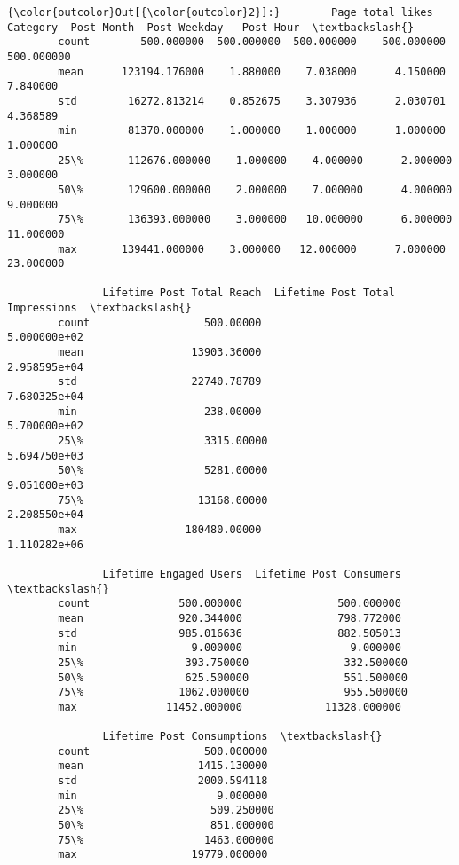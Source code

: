 \documentclass[11pt]{article}
\begin{document}
\begin{Verbatim}[commandchars=\\\{\}]
{\color{outcolor}Out[{\color{outcolor}2}]:}        Page total likes    Category  Post Month  Post Weekday   Post Hour  \textbackslash{}
        count        500.000000  500.000000  500.000000    500.000000  500.000000   
        mean      123194.176000    1.880000    7.038000      4.150000    7.840000   
        std        16272.813214    0.852675    3.307936      2.030701    4.368589   
        min        81370.000000    1.000000    1.000000      1.000000    1.000000   
        25\%       112676.000000    1.000000    4.000000      2.000000    3.000000   
        50\%       129600.000000    2.000000    7.000000      4.000000    9.000000   
        75\%       136393.000000    3.000000   10.000000      6.000000   11.000000   
        max       139441.000000    3.000000   12.000000      7.000000   23.000000   
        
               Lifetime Post Total Reach  Lifetime Post Total Impressions  \textbackslash{}
        count                  500.00000                     5.000000e+02   
        mean                 13903.36000                     2.958595e+04   
        std                  22740.78789                     7.680325e+04   
        min                    238.00000                     5.700000e+02   
        25\%                   3315.00000                     5.694750e+03   
        50\%                   5281.00000                     9.051000e+03   
        75\%                  13168.00000                     2.208550e+04   
        max                 180480.00000                     1.110282e+06   
        
               Lifetime Engaged Users  Lifetime Post Consumers  \textbackslash{}
        count              500.000000               500.000000   
        mean               920.344000               798.772000   
        std                985.016636               882.505013   
        min                  9.000000                 9.000000   
        25\%                393.750000               332.500000   
        50\%                625.500000               551.500000   
        75\%               1062.000000               955.500000   
        max              11452.000000             11328.000000   
        
               Lifetime Post Consumptions  \textbackslash{}
        count                  500.000000   
        mean                  1415.130000   
        std                   2000.594118   
        min                      9.000000   
        25\%                    509.250000   
        50\%                    851.000000   
        75\%                   1463.000000   
        max                  19779.000000   
        

\end{Verbatim}
\end{document}
